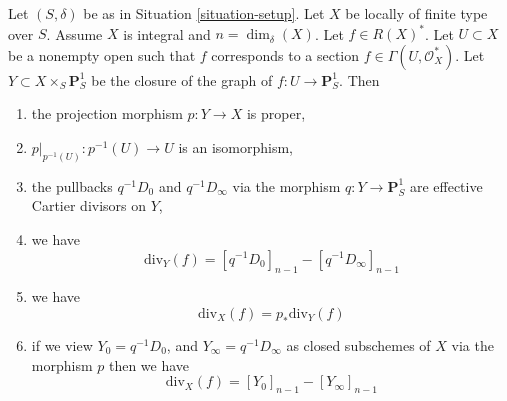 \begin{lemma}
\label{lemma-rational-function}
Let $(S, \delta)$ be as in Situation \ref{situation-setup}.
Let $X$ be locally of finite type over $S$. Assume $X$ is
integral and $n = \dim_\delta(X)$. Let $f \in R(X)^*$.
Let $U \subset X$ be a nonempty open such that $f$
corresponds to a section $f \in \Gamma(U, \mathcal{O}_X^*)$.
Let $Y \subset X \times_S \mathbf{P}^1_S$ be the
closure of the graph of $f : U \to \mathbf{P}^1_S$.
Then
\begin{enumerate}
\item the projection morphism $p : Y \to X$ is proper,
\item $p|_{p^{-1}(U)} : p^{-1}(U) \to U$ is an isomorphism,
\item the pullbacks $q^{-1}D_0$ and $q^{-1}D_\infty$ via the morphism
$q : Y \to \mathbf{P}^1_S$ are effective Cartier divisors on $Y$,
\item we have
$$
\text{div}_Y(f) = [q^{-1}D_0]_{n - 1} - [q^{-1}D_\infty]_{n - 1}
$$
\item we have
$$
\text{div}_X(f) = p_*\text{div}_Y(f)
$$
\item if we view $Y_0 = q^{-1}D_0$, and
$Y_\infty = q^{-1}D_\infty$ as closed subschemes of $X$
via the morphism $p$ then we have
$$
\text{div}_X(f) = [Y_0]_{n - 1} - [Y_\infty]_{n - 1}
$$
\end{enumerate}
\end{lemma}

